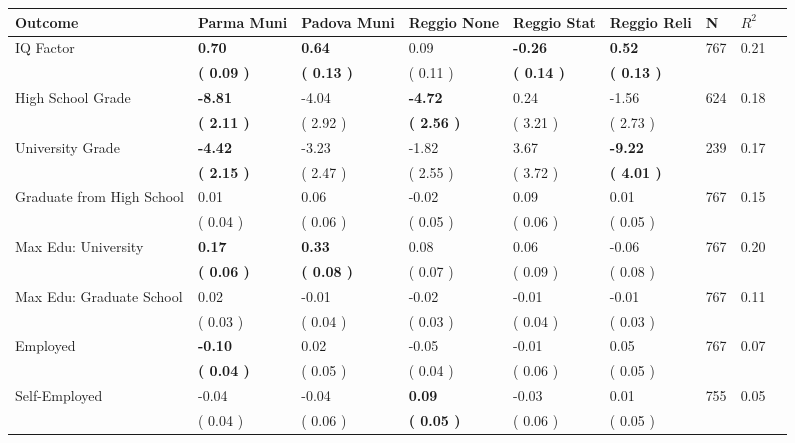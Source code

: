\begin{tabular}{L{6.2cm} C{1.8cm} C{1.8cm} C{1.8cm} C{1.8cm} C{1.8cm} C{1.8cm} C{0.3cm} C{0.3cm}}
\toprule
 \textbf{Outcome} & \textbf{Parma Muni} & \textbf{Padova Muni} & \textbf{Reggio None} & \textbf{Reggio Stat} & \textbf{Reggio Reli} & \textbf{N} & \textbf{$ R^2$} \\
\midrule
IQ Factor & \textbf{     0.70} & \textbf{     0.64} &      0.09 & \textbf{    -0.26} & \textbf{     0.52}  & 767 &       0.21 \\ 
 & \textbf{(     0.09 )} & \textbf{(     0.13 )} & (     0.11 ) & \textbf{(     0.14 )} & \textbf{(     0.13 )}  & \\
High School Grade & \textbf{    -8.81} &     -4.04 & \textbf{    -4.72} &      0.24 &     -1.56  & 624 &       0.18 \\ 
 & \textbf{(     2.11 )} & (     2.92 ) & \textbf{(     2.56 )} & (     3.21 ) & (     2.73 )  & \\
University Grade & \textbf{    -4.42} &     -3.23 &     -1.82 &      3.67 & \textbf{    -9.22}  & 239 &       0.17 \\ 
 & \textbf{(     2.15 )} & (     2.47 ) & (     2.55 ) & (     3.72 ) & \textbf{(     4.01 )}  & \\
Graduate from High School &      0.01 &      0.06 &     -0.02 &      0.09 &      0.01  & 767 &       0.15 \\ 
 & (     0.04 ) & (     0.06 ) & (     0.05 ) & (     0.06 ) & (     0.05 )  & \\
Max Edu: University & \textbf{     0.17} & \textbf{     0.33} &      0.08 &      0.06 &     -0.06  & 767 &       0.20 \\ 
 & \textbf{(     0.06 )} & \textbf{(     0.08 )} & (     0.07 ) & (     0.09 ) & (     0.08 )  & \\
Max Edu: Graduate School &      0.02 &     -0.01 &     -0.02 &     -0.01 &     -0.01  & 767 &       0.11 \\ 
 & (     0.03 ) & (     0.04 ) & (     0.03 ) & (     0.04 ) & (     0.03 )  & \\
Employed & \textbf{    -0.10} &      0.02 &     -0.05 &     -0.01 &      0.05  & 767 &       0.07 \\ 
 & \textbf{(     0.04 )} & (     0.05 ) & (     0.04 ) & (     0.06 ) & (     0.05 )  & \\
Self-Employed &     -0.04 &     -0.04 & \textbf{     0.09} &     -0.03 &      0.01  & 755 &       0.05 \\ 
 & (     0.04 ) & (     0.06 ) & \textbf{(     0.05 )} & (     0.06 ) & (     0.05 )  & \\

\end{tabular}
